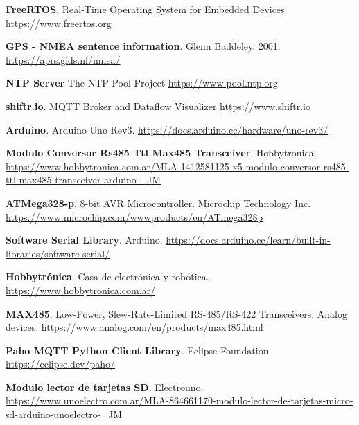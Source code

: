\begin{thebibliography}{30}
\textbf{FreeRTOS}. Real-Time Operating System for Embedded Devices.
\href{https://www.freertos.org}{https://www.freertos.org}




\textbf{GPS - NMEA sentence information}. Glenn Baddeley. 2001.
\href{https://aprs.gids.nl/nmea/}{https://aprs.gids.nl/nmea/}

\textbf{NTP Server} The NTP Pool Project
\href{https://www.pool.ntp.org}{https://www.pool.ntp.org}


\textbf{shiftr.io}. MQTT Broker and Dataflow Visualizer
\href{https://www.shiftr.io}{https://www.shiftr.io}

\textbf{Arduino}. Arduino Uno Rev3.
\href{https://docs.arduino.cc/hardware/uno-rev3/}{https://docs.arduino.cc/hardware/uno-rev3/}

\textbf{Modulo Conversor Rs485 Ttl Max485 Transceiver}. Hobbytronica. 
\href{https://www.hobbytronica.com.ar/MLA-1412581125-x5-modulo-conversor-rs485-ttl-max485-transceiver-arduino-_JM}{https://www.hobbytronica.com.ar/MLA-1412581125-x5-modulo-conversor-rs485-ttl-max485-transceiver-arduino-\_JM}

\textbf{ATMega328-p}. 8-bit AVR Microcontroller. Microchip Technology Inc. 
\href{https://www.microchip.com/wwwproducts/en/ATmega328p}{https://www.microchip.com/wwwproducts/en/ATmega328p}

\textbf{Software Serial Library}. Arduino. 
\href{https://docs.arduino.cc/learn/built-in-libraries/software-serial/}{https://docs.arduino.cc/learn/built-in-libraries/software-serial/}


\textbf{Hobbytrónica}. Casa de electrónica y robótica. 
\href{https://docs.arduino.cc/learn/built-in-libraries/software-serial/}{https://www.hobbytronica.com.ar/}

\textbf{MAX485}. Low-Power, Slew-Rate-Limited RS-485/RS-422 Transceivers. Analog devices.
\href{https://www.analog.com/en/products/max485.html}{https://www.analog.com/en/products/max485.html}

\textbf{Paho MQTT Python Client Library}. Eclipse Foundation. 
\href{https://eclipse.dev/paho/}{https://eclipse.dev/paho/}


\textbf{Modulo lector de tarjetas SD}. Electrouno. 
\href{https://www.unoelectro.com.ar/MLA-864661170-modulo-lector-de-tarjetas-micro-sd-arduino-unoelectro-_JM}{https://www.unoelectro.com.ar/MLA-864661170-modulo-lector-de-tarjetas-micro-sd-arduino-unoelectro-\_JM}




 \end{thebibliography}